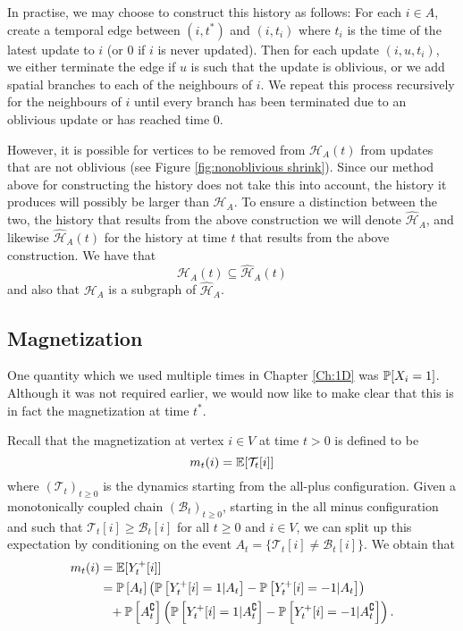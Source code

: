 In practise, we may choose to construct this history as follows: For each $i \in A$, create a temporal edge between $(i, t^*)$ and $(i, t_i)$ where $t_i$ is the time of the latest update to $i$ (or $0$ if $i$ is never updated). Then for each update $(i, u, t_i)$, we either terminate the edge if $u$ is such that the update is oblivious, or we add spatial branches to each of the neighbours of $i$. We repeat this process recursively for the neighbours of $i$ until every branch has been terminated due to an oblivious update or has reached time $0$.

However, it is possible for vertices to be removed from $\mathcal{H}_A(t)$ from updates that are not oblivious (see Figure \ref{fig:nonoblivious shrink}). Since our method above for constructing the history does not take this into account, the history it produces will possibly be larger than $\mathcal{H}_A$. To ensure a distinction between the two, the history that results from the above construction we will denote $\hat{\mathcal{H}}_A$, and likewise $\hat{\mathcal{H}}_A(t)$ for the history at time $t$ that results from the above construction. We have that
\begin{equation}
	\mathcal{H}_A(t) \subseteq \hat{\mathcal{H}}_A(t)
\end{equation}
and also that $\mathcal{H}_A$ is a subgraph of $\hat{\mathcal{H}}_A$.

\subsection{Magnetization}
One quantity which we used multiple times in Chapter \ref{Ch:1D} was $\mathbb{P}[X_i = 1]$. Although it was not required earlier, we would now like to make clear that this is in fact the magnetization at time $t^*$. 

Recall that the magnetization at vertex $i \in V$ at time $t > 0$ is defined to be
\begin{equation}
	m_t(i) = \mathbb{E}[\mathcal{T}_t[i]]
\end{equation}
where $(\mathcal{T}_t)_{t \geq 0}$ is the dynamics starting from the all-plus configuration. %
Given a monotonically coupled chain $(\mathcal{B}_t)_{t\geq0}$, starting in the all minus configuration and such that $\mathcal{T}_t[i] \geq \mathcal{B}_t[i]$ for all $t\geq 0$ and $i \in V$, we can split up this expectation by conditioning on the event $A_t = \{\mathcal{T}_t[i] \neq \mathcal{B}_t[i]\}$. We obtain that
\begin{align}
	m_t(i) &= \mathbb{E}[Y_t^+[i]]\\
	&= \mathbb{P}\left[A_t\right] \left(\mathbb{P}\left[Y_t^+[i] = 1 | A_t\right] - \mathbb{P}\left[Y_t^+[i] = -1|A_t\right]\right)  \\
	&\phantom{= } + \mathbb{P}\left[A_t^\complement\right] \left( \mathbb{P}\left[Y_t^+[i] = 1 |A_t^\complement\right] - \mathbb{P}\left[Y_t^+[i] = -1|A_t^\complement\right] \right). \notag
\end{align}

